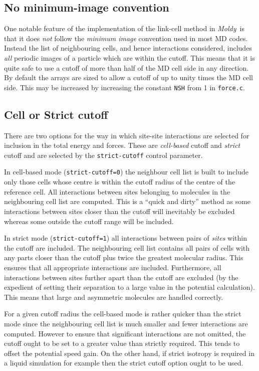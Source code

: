\documentclass[twoside]{report}
\newcommand{\moldy}{{\em Moldy}}
\begin{document}
\subsection{No minimum-image convention}
One notable feature of the implementation of the link-cell method in
\moldy\ is that it does {\em not\/} follow the {\em minimum image\/}
convention used in most MD codes.  Instead the list of neighbouring
cells, and hence interactions considered, includes {\em all\/} periodic
images of a particle which are within the cutoff.  This means that it
is quite safe to use a cutoff of more than half of the MD cell side in
any direction.  By default the arrays are sized to allow a cutoff of
up to unity times the MD cell side.  This may be increased by
increasing the constant \texttt{NSH} from 1 in \texttt{force.c}.


\subsection{Cell or Strict cutoff}
There are two options for the way in which site-site interactions are
selected for inclusion in the total energy and forces.  These are
{\em cell-based\/} cutoff and {\em strict\/} cutoff and are selected
by the \texttt{strict-cutoff} control parameter.

In cell-based mode (\texttt{strict-cutoff=0}) the neighbour cell list is
built to include only those cells whose centre is within the cutoff
radius of the centre of the reference cell.  All interactions between
sites belonging to molecules in the neighbouring cell list are
computed.  This is a ``quick and dirty'' method as some interactions
between sites closer than the cutoff will inevitably be excluded
whereas some outside the cutoff range will be included.

In strict mode (\texttt{strict-cutoff=1}) all interactions between pairs
of {\em sites\/} within the cutoff are included.  The neighbouring cell
list contains all pairs of cells with any parts closer than the cutoff
plus twice the greatest molecular radius.  This ensures that all
appropriate interactions are included.  Furthermore, all interactions
between sites further apart than the cutoff are excluded (by the
expedient of setting their separation to a large value in the
potential calculation).  This means that large and asymmetric
molecules are handled correctly.  

For a given cutoff radius the cell-based mode is rather quicker than
the strict mode since the neighbouring cell list is much smaller and
fewer interactions are computed.  However to ensure that significant
interactions are not omitted, the cutoff ought to be set to a
greater value than strictly required.    This tends to offset the
potential speed gain.   On the other hand, if strict isotropy is
required in a liquid simulation for example then the strict cutoff
option ought to be used.
\end{document}
